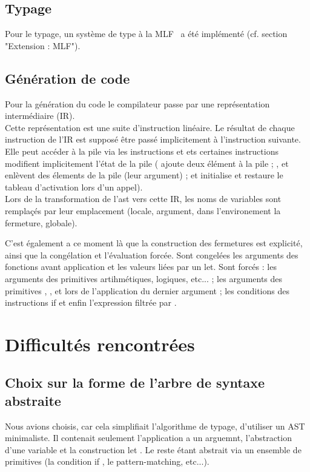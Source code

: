 \documentclass[a4paper]{article}
\begin{document}
\subsection{Typage}
Pour le typage, un système de type \og à la MLF \fg ~a été implémenté
(cf. section "Extension : MLF"). %

\subsection{Génération de code}
Pour la génération du code le compilateur passe par une représentation intermédiaire (IR). \\
Cette représentation est une suite d'instruction linéaire. Le résultat de chaque instruction de l'IR est supposé être passé implicitement à l'instruction suivante. \\
Elle peut accéder à la pile via les instructions  et  ets certaines instructions modifient implicitement l'état de la pile ( ajoute deux élément à la pile ; ,  et  enlèvent des élements de la pile (leur argument) ;  et  initialise et restaure le tableau d'activation lors d'un appel). \\
Lors de la transformation de l'ast vers cette IR, les noms de
variables sont remplaçés par leur emplacement (locale, argument, dans
l'environement la fermeture, globale).

C'est également a ce moment là que la construction des fermetures est
explicité, ainsi que la congélation et l'évaluation forcée. Sont
congelées les arguments des fonctions avant application et les valeurs
liées par un let. Sont forcés : les arguments des primitives
artihmétiques, logiques, etc... ; les arguments des primitives
, ,  et  lors de
l'application du dernier argument ; les conditions des instructions if
et enfin l'expression filtrée par .


\section{Difficultés rencontrées}

\subsection{Choix sur la forme de l'arbre de syntaxe abstraite}
Nous avions choisis, car cela simplifiait l'algorithme de typage,
d'utiliser un AST minimaliste. Il contenait seulement l'application a
un arguemnt, l'abstraction d'une variable et la construction \og let
\fg. Le reste étant abstrait via un ensemble de primitives (la
condition \og if \fg, le pattern-matching, etc...).
\end{document}
